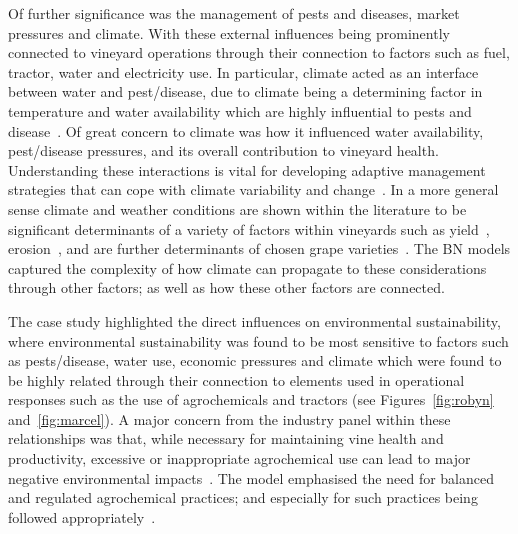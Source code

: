 Of further significance was the management of pests and diseases, market pressures and climate. With these external influences being prominently connected to vineyard operations through their connection to factors such as fuel, tractor, water and electricity use. In particular, climate acted as an interface between water and pest/disease, due to climate being a determining factor in temperature and water availability which are highly influential to pests and disease~\cite{boisClimateVsGrapevine2017}. Of great concern to climate was how it influenced water availability, pest/disease pressures, and its overall contribution to vineyard health. Understanding these interactions is vital for developing adaptive management strategies that can cope with climate variability and change~\cite{agostaRegionalClimateVariability2012,alsafadiFutureScenariosBioclimatic2023,barriguinhaVineyardYieldEstimation2021,sharmaChapterImpactClimate2014}. In a more general sense climate and weather conditions are shown within the literature to be significant determinants of a variety of factors within vineyards such as yield~\cite{barriguinhaVineyardYieldEstimation2021,antonComparativeStudyRisk2012}, erosion~\cite{biddoccuEvaluationSoilErosion2020,doi:10.1177/0309133319861833}, and are further determinants of chosen grape varieties~\cite{topferGrapeVarietiesAre2022, petriashviliImpactClimateChange2023}. The BN models captured the complexity of how climate can propagate to these considerations through other factors; as well as how these other factors are connected.

The case study highlighted the direct influences on environmental sustainability, where environmental sustainability was found to be most sensitive to factors such as pests/disease, water use, economic pressures and climate which were found to be highly related through their connection to elements used in operational responses such as the use of agrochemicals and tractors (see Figures~\ref{fig:robyn} and~\ref{fig:marcel}). A major concern from the industry panel within these relationships was that, while necessary for maintaining vine health and productivity, excessive or inappropriate agrochemical use can lead to major negative environmental impacts~\cite{alonsogonzalezUnveilingTerroirEvaluating2024,manjarres-lopezAssessmentPesticideResidues2021}. The model emphasised the need for balanced and regulated agrochemical practices; and especially for such practices being followed appropriately~\cite{baianoOverviewSustainabilityWine2021}.

